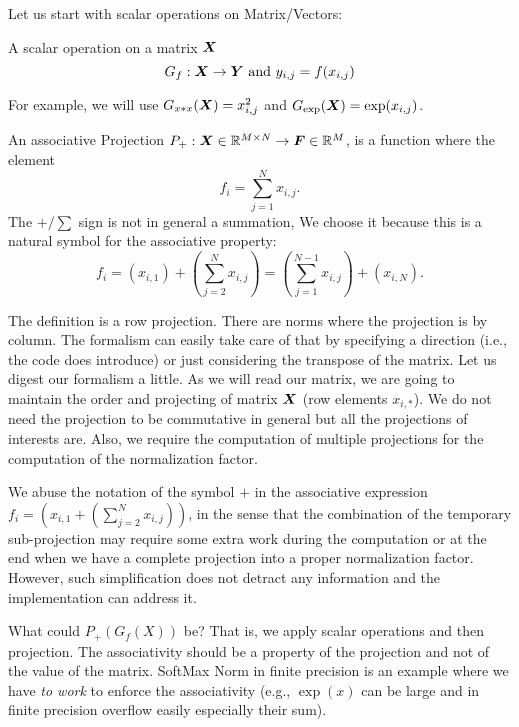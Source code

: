 \documentclass[acmsmall]{acmart}
\begin{document}
Let us start with scalar operations on Matrix/Vectors:
\begin{definition}
  A scalar operation on a matrix ${\boldsymbol X}$
  \begin{equation}
    G_f: {\boldsymbol X} \rightarrow {\boldsymbol Y} \text{ and }  y_{i,j} = f(x_{i,j})
  \end{equation}
\end{definition}

For example, we will use $G_{x*x}({\boldsymbol X}) = x_{i,j}^2$ and
$G_{\exp}({\boldsymbol X}) = \exp(x_{i,j})$. 


\begin{definition}
An associative Projection $P_+: {\boldsymbol X}\in\mathbb{R}^{M\times N} \rightarrow
{\boldsymbol F} \in \mathbb{R}^{M}$, is a function where the element
\[ f_i = \sum_{j=1}^N x_{i,j}. \]
The $+/\sum$ sign is not in general a summation, We choose it because
this is a natural symbol for the associative property:
\[
f_i = (x_{i,1}) + (\sum_{j=2}^N x_{i,j}) = (\sum_{j=1}^{N-1} x_{i,j}) + (x_{i,N}).
\]

\end{definition}
The definition is a row projection.  There are norms where the
projection is by column. The formalism can easily take care of that by
specifying a direction (i.e., the code does introduce) or just
considering the transpose of the matrix.  Let us digest our formalism
a little.  As we will read our matrix, we are going to maintain the
order and projecting of matrix ${\boldsymbol X}$ (row elements $x_{i,*}$). We
do not need the projection to be commutative in general but all the
projections of interests are. Also, we require the computation of
multiple projections for the computation of the normalization factor.

We abuse the notation of the symbol $+$ in the associative expression
$f_i = (x_{i,1} + (\sum_{j=2}^N x_{i,j}))$, in the sense that the
combination of the temporary sub-projection may require some extra
work during the computation or at the end when we have a complete
projection into a proper normalization factor. However, such
simplification does not detract any information and the implementation
can address it.

What could $P_+(G_f(X))$ be? That is, we apply scalar operations and
then projection. The associativity should be a property of the
projection and not of the value of the matrix. SoftMax Norm in finite
precision is an example where we have {\em to work} to enforce the
associativity (e.g., $\exp(x)$ can be large and in finite precision
overflow easily especially their sum).
\end{document}
